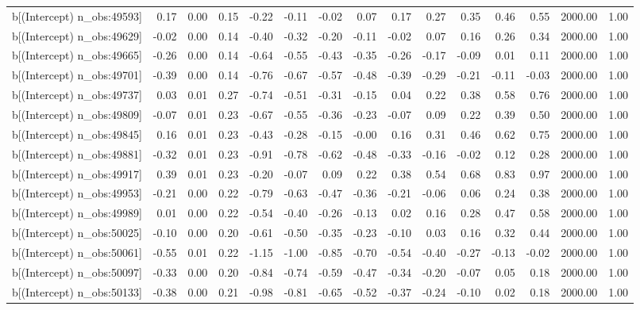 \begin{table}[ht]
\begin{tabular}{rrrrrrrrrrrrrrr}
  b[(Intercept) n\_obs:49593] & 0.17 & 0.00 & 0.15 & -0.22 & -0.11 & -0.02 & 0.07 & 0.17 & 0.27 & 0.35 & 0.46 & 0.55 & 2000.00 & 1.00 \\ 
  b[(Intercept) n\_obs:49629] & -0.02 & 0.00 & 0.14 & -0.40 & -0.32 & -0.20 & -0.11 & -0.02 & 0.07 & 0.16 & 0.26 & 0.34 & 2000.00 & 1.00 \\ 
  b[(Intercept) n\_obs:49665] & -0.26 & 0.00 & 0.14 & -0.64 & -0.55 & -0.43 & -0.35 & -0.26 & -0.17 & -0.09 & 0.01 & 0.11 & 2000.00 & 1.00 \\ 
  b[(Intercept) n\_obs:49701] & -0.39 & 0.00 & 0.14 & -0.76 & -0.67 & -0.57 & -0.48 & -0.39 & -0.29 & -0.21 & -0.11 & -0.03 & 2000.00 & 1.00 \\ 
  b[(Intercept) n\_obs:49737] & 0.03 & 0.01 & 0.27 & -0.74 & -0.51 & -0.31 & -0.15 & 0.04 & 0.22 & 0.38 & 0.58 & 0.76 & 2000.00 & 1.00 \\ 
  b[(Intercept) n\_obs:49809] & -0.07 & 0.01 & 0.23 & -0.67 & -0.55 & -0.36 & -0.23 & -0.07 & 0.09 & 0.22 & 0.39 & 0.50 & 2000.00 & 1.00 \\ 
  b[(Intercept) n\_obs:49845] & 0.16 & 0.01 & 0.23 & -0.43 & -0.28 & -0.15 & -0.00 & 0.16 & 0.31 & 0.46 & 0.62 & 0.75 & 2000.00 & 1.00 \\ 
  b[(Intercept) n\_obs:49881] & -0.32 & 0.01 & 0.23 & -0.91 & -0.78 & -0.62 & -0.48 & -0.33 & -0.16 & -0.02 & 0.12 & 0.28 & 2000.00 & 1.00 \\ 
  b[(Intercept) n\_obs:49917] & 0.39 & 0.01 & 0.23 & -0.20 & -0.07 & 0.09 & 0.22 & 0.38 & 0.54 & 0.68 & 0.83 & 0.97 & 2000.00 & 1.00 \\ 
  b[(Intercept) n\_obs:49953] & -0.21 & 0.00 & 0.22 & -0.79 & -0.63 & -0.47 & -0.36 & -0.21 & -0.06 & 0.06 & 0.24 & 0.38 & 2000.00 & 1.00 \\ 
  b[(Intercept) n\_obs:49989] & 0.01 & 0.00 & 0.22 & -0.54 & -0.40 & -0.26 & -0.13 & 0.02 & 0.16 & 0.28 & 0.47 & 0.58 & 2000.00 & 1.00 \\ 
  b[(Intercept) n\_obs:50025] & -0.10 & 0.00 & 0.20 & -0.61 & -0.50 & -0.35 & -0.23 & -0.10 & 0.03 & 0.16 & 0.32 & 0.44 & 2000.00 & 1.00 \\ 
  b[(Intercept) n\_obs:50061] & -0.55 & 0.01 & 0.22 & -1.15 & -1.00 & -0.85 & -0.70 & -0.54 & -0.40 & -0.27 & -0.13 & -0.02 & 2000.00 & 1.00 \\ 
  b[(Intercept) n\_obs:50097] & -0.33 & 0.00 & 0.20 & -0.84 & -0.74 & -0.59 & -0.47 & -0.34 & -0.20 & -0.07 & 0.05 & 0.18 & 2000.00 & 1.00 \\ 
  b[(Intercept) n\_obs:50133] & -0.38 & 0.00 & 0.21 & -0.98 & -0.81 & -0.65 & -0.52 & -0.37 & -0.24 & -0.10 & 0.02 & 0.18 & 2000.00 & 1.00 \\ 

\end{tabular}
\end{table}
